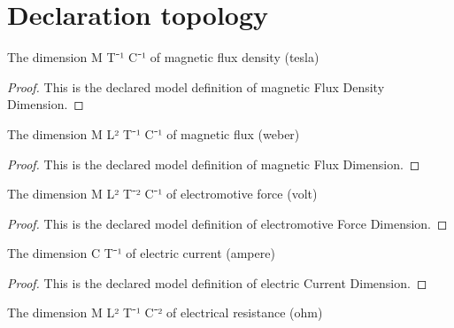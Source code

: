 \section{Declaration topology}
\begin{definition}
  \label{def:physics:phyx-mini-0932:phyxminiproblems-problemphyxmini0932-magneticfluxdensitydimension}
  The dimension M T⁻¹ C⁻¹ of magnetic flux density (tesla)
\end{definition}
\begin{proof}
  This is the declared model definition of magnetic Flux Density Dimension.
\end{proof}
\begin{definition}
  \label{def:physics:phyx-mini-0932:phyxminiproblems-problemphyxmini0932-magneticfluxdimension}
  The dimension M L² T⁻¹ C⁻¹ of magnetic flux (weber)
\end{definition}
\begin{proof}
  This is the declared model definition of magnetic Flux Dimension.
\end{proof}
\begin{definition}
  \label{def:physics:phyx-mini-0932:phyxminiproblems-problemphyxmini0932-electromotiveforcedimension}
  The dimension M L² T⁻² C⁻¹ of electromotive force (volt)
\end{definition}
\begin{proof}
  This is the declared model definition of electromotive Force Dimension.
\end{proof}
\begin{definition}
  \label{def:physics:phyx-mini-0932:phyxminiproblems-problemphyxmini0932-electriccurrentdimension}
  The dimension C T⁻¹ of electric current (ampere)
\end{definition}
\begin{proof}
  This is the declared model definition of electric Current Dimension.
\end{proof}
\begin{definition}
  \label{def:physics:phyx-mini-0932:phyxminiproblems-problemphyxmini0932-electricalresistancedimension}
  The dimension M L² T⁻¹ C⁻² of electrical resistance (ohm)
\end{definition}
